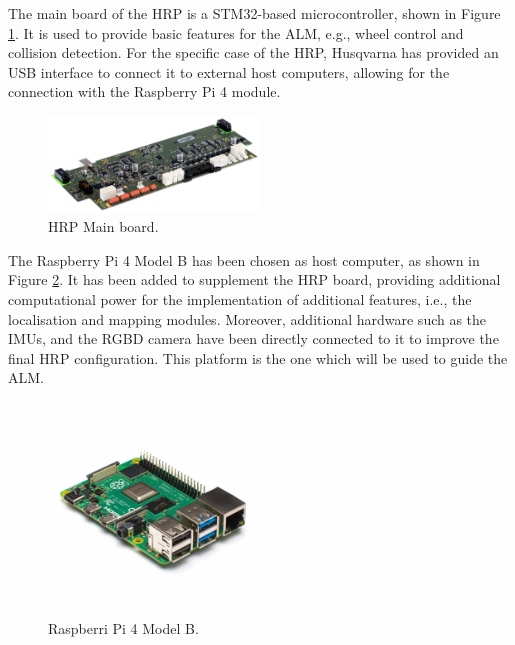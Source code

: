 The main board of the \gls{HRP} is a STM32-based microcontroller, shown in Figure \ref{fig:hrp-board}.
It is used to provide basic features for the \gls{ALM}, e.g., wheel control and collision detection. 
For the specific case of the \gls{HRP}, Husqvarna has provided an USB interface to connect it to external host computers, allowing for the connection with the Raspberry Pi 4 module.
\begin{figure}[!ht]
	\begin{center}
			\begin{center}
				\includegraphics[width=0.5\textwidth]{Images/3-0-SetUp/586813503.png}
			\end{center}
			\caption{\gls{HRP} Main board.}
			\label{fig:hrp-board}
	\end{center}
\end{figure}

The Raspberry Pi 4 Model B has been chosen as host computer, as shown in Figure \ref{fig:rpi4}.
It has been added to supplement the \gls{HRP} board, providing additional computational power for the implementation of additional features, i.e., the localisation and mapping modules. 
Moreover, additional hardware such as the \glspl{IMU}, and the \gls{RGBD} camera have been directly connected to it to improve the final \gls{HRP} configuration.
This platform is the one which will be used to guide the \gls{ALM}.
\begin{figure}[!ht]
	\begin{center}
			\begin{center}
				\includegraphics[clip, trim=2cm 8cm 2cm 10cm , width=0.5\textwidth]{Images/4-Methods/RPi4.jpg}
			\end{center}
			\caption{Raspberri Pi 4 Model B.}
			\label{fig:rpi4}
	\end{center}
\end{figure}

